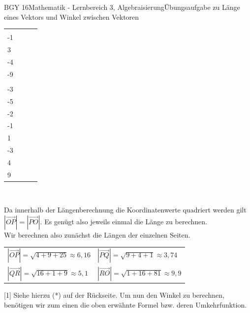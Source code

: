 \documentclass[oneside,openany,headings=optiontotoc,11pt,numbers=noenddot]{scrreprt}
\begin{document}
\begin{worksheet}{BGY 16}{Mathematik - Lernbereich 3, Algebraisierung}{Übungsaufgabe zu Länge eines Vektors und Winkel zwischen Vektoren}
\begin{framed}
\begin{tabularx}{\textwidth}{XXXX}
				\(\vec{QR}=\left(\begin{array}{c}-4\\-1\\3\end{array}\right)\) &
				\(\vec{RO}=\left(\begin{array}{c}-1\\-4\\-9\end{array}\right)\)\\
				\(\vec{PO}= \left(\begin{array}{c}-2\\-3 \\-5\end{array}\right)\) &
				\(\vec{QP}=\left(\begin{array}{c}-3\\-2\\-1\end{array}\right)\) &
				\(\vec{RQ}=\left(\begin{array}{c}4\\1\\-3\end{array}\right)\)&
				\(\vec{OR}=\left(\begin{array}{c}1\\4\\9\end{array}\right)\)
			\end{tabularx}
			\\
			\par\noindent
			\tiny{\color{codegray}Da innerhalb der Längenberechnung die Koordinatenwerte quadriert werden gilt \(|\vec{OP}| = |\vec{PO}|\). Es genügt also jeweils einmal die Länge zu berechnen.}\\\noindent
			\normalsize
			Wir berechnen also zunächst die Längen der einzelnen Seiten.\\
			\par\noindent
			\begin{tabularx}{\textwidth}{XX}
				\(|\vec{OP}| = \sqrt{4+9+25} \approx 6,16\) & \(|\vec{PQ}| = \sqrt{9 + 4 + 1} \approx 3,74\)\\
				\(|\vec{QR}| = \sqrt{16 + 1 + 9} \approx 5,1\) & \(|\vec{RO}| = \sqrt{1 + 16 + 81} \approx 9,9 \)
			\end{tabularx}
		\par\bigskip\noindent
		\small{\color{codegray}[1] Siehe hierzu (*) auf der Rückseite.}
		\newpage
		\noindent
		Um nun den Winkel zu berechnen, benötigen wir zum einen die oben erwähnte Formel bzw. deren Umkehrfunktion.\\

\end{framed}
\end{worksheet}
\end{document}
